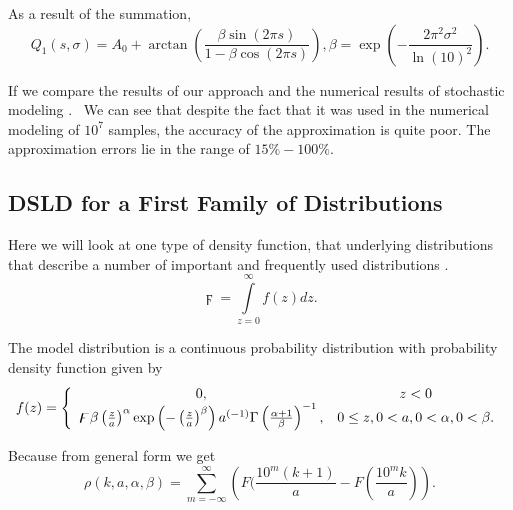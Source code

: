 \documentclass[titlepage,fleqn]{article}%
\begin{document}
As a result of the summation,%
\begin{equation}
Q_{1}\left(  s,\sigma\right)  =A_{0}+\arctan\left(  \frac{\beta\sin(2\pi
s)}{1-\beta\cos(2\pi s)}\right)  ,\beta=\exp\left(  -\frac{2\pi^{2}\sigma^{2}%
}{\ln(10)^{2}}\right)  .
\end{equation}


If we compare the results of our approach and the numerical results of
stochastic modeling
\cite{formann0}%
. \ We can see that despite the fact that it was used in the numerical
modeling of $10^{7}$ samples, the accuracy of the approximation is quite poor.
The approximation errors lie in the range of $15\%-100\%$.

\subsection{DSLD for a First Family of Distributions}%

\label{DfWD}%


Here we will look at one type of density function, that underlying
distributions that describe a number of important and frequently used
distributions
\cite{walck}
.%
\[
\digamma=%
{\displaystyle\int\limits_{z=0}^{\infty}}
f(z)dz.
\]


The model distribution is a continuous probability distribution with
probability density function given by%
\begin{equation}
f(z)=\left\{
\begin{array}
[c]{cc}%
0, & z<0\\
\digamma\beta\left(  \frac{z}{a}\right)  ^{\alpha}\exp\left(  -\left(
\frac{z}{a}\right)  ^{\beta}\right)  a^{(-1)}\Gamma\left(  \frac{\alpha
+1}{\beta}\right)  ^{-1}, & 0\leq z,0<a,0<\alpha,0<\beta.
\end{array}
\right.  \label{defWD}%
\end{equation}


Because from general form we get
\begin{equation}
\rho(k,a,\alpha,\beta)=%
{\displaystyle\sum\limits_{m=-\infty}^{\infty}}
\left(  F(\frac{10^{m}(k+1)}{a}-F\left(  \frac{10^{m}k}{a}\right)  \right)  .
\label{WA_rho}%
\end{equation}
\end{document}

